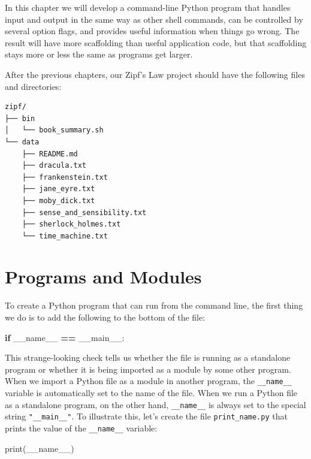 \documentclass[
]{krantz}
\makeatletter
\newenvironment{Shaded}{\begin{snugshade}}{\end{snugshade}}
\newcommand{\BuiltInTok}[1]{#1}
\newcommand{\ControlFlowTok}[1]{\textcolor[rgb]{0.13,0.29,0.53}{\textbf{#1}}}
\newcommand{\NormalTok}[1]{#1}
\newcommand{\OperatorTok}[1]{\textcolor[rgb]{0.81,0.36,0.00}{\textbf{#1}}}
\newcommand{\StringTok}[1]{\textcolor[rgb]{0.31,0.60,0.02}{#1}}
\newcommand{\VariableTok}[1]{\textcolor[rgb]{0.00,0.00,0.00}{#1}}
\newenvironment{kframe}{%
\medskip{}
\setlength{\fboxsep}{.8em}
 \def\at@end@of@kframe{}%
 \ifinner\ifhmode%
  \def\at@end@of@kframe{\end{minipage}}%
  \begin{minipage}{\columnwidth}%
 \fi\fi%
 \def\FrameCommand##1{\hskip\@totalleftmargin \hskip-\fboxsep
 \colorbox{shadecolor}{##1}\hskip-\fboxsep
     \hskip-\linewidth \hskip-\@totalleftmargin \hskip\columnwidth}%
 \MakeFramed {\advance\hsize-\width
   \@totalleftmargin\z@ \linewidth\hsize
   \@setminipage}}%
 {\par\unskip\endMakeFramed%
 \at@end@of@kframe}
\renewenvironment{Shaded}{\begin{kframe}}{\end{kframe}}
\makeatother
\begin{document}
In this chapter we will develop a command-line Python program
that handles input and output in the same way as other shell commands,
can be controlled by several option flags,
and provides useful information when things go wrong.
The result will have more scaffolding than useful application code,
but that scaffolding stays more or less the same as programs get larger.

After the previous chapters,
our Zipf's Law project should have the following files and directories:

\begin{verbatim}
zipf/
├── bin
│   └── book_summary.sh
└── data
    ├── README.md
    ├── dracula.txt
    ├── frankenstein.txt
    ├── jane_eyre.txt
    ├── moby_dick.txt
    ├── sense_and_sensibility.txt
    ├── sherlock_holmes.txt
    └── time_machine.txt
\end{verbatim}

\hypertarget{scripting-main}{%
\section{Programs and Modules}\label{scripting-main}}

To create a Python program that can run from the command line,
the first thing we do is to add the following to the bottom of the file:

\begin{Shaded}
\begin{Highlighting}[]
\ControlFlowTok{if} \VariableTok{\_\_name\_\_} \OperatorTok{==} \StringTok{\textquotesingle{}\_\_main\_\_\textquotesingle{}}\NormalTok{:}
\end{Highlighting}
\end{Shaded}

This strange-looking check tells us
whether the file is running as a standalone program
or whether it is being imported as a module by some other program.
When we import a Python file as a module in another program,
the \texttt{\_\_name\_\_} variable is automatically set to the name of the file.
When we run a Python file as a standalone program,
on the other hand,
\texttt{\_\_name\_\_} is always set to the special string \texttt{"\_\_main\_\_"}.
To illustrate this,
let's create the file \texttt{print\_name.py}
that prints the value of the \texttt{\_\_name\_\_} variable:

\begin{Shaded}
\begin{Highlighting}[]
\BuiltInTok{print}\NormalTok{(}\VariableTok{\_\_name\_\_}\NormalTok{)}
\end{Highlighting}
\end{Shaded}
\end{document}
